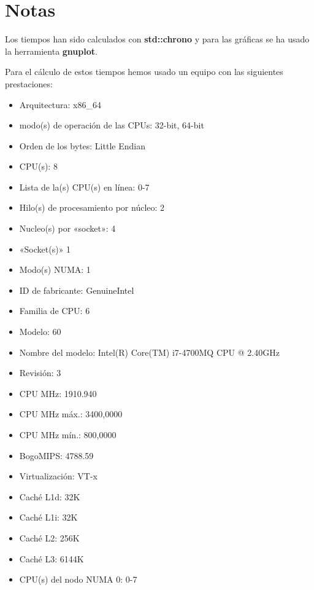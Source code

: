 \documentclass{article}
\begin{document}
\section{Notas}
Los tiempos han sido calculados con {\bf std::chrono} y para las gráficas se ha usado la herramienta {\bf gnuplot}.
\

Para el cálculo de estos tiempos hemos usado un equipo con las siguientes prestaciones:
\begin{itemize}
	\item Arquitectura:                        x86\_64
	\item modo(s) de operación de las CPUs:    32-bit, 64-bit
	\item Orden de los bytes:                  Little Endian
	\item CPU(s):                              8
	\item Lista de la(s) CPU(s) en línea:      0-7
	\item Hilo(s) de procesamiento por núcleo: 2
	\item Nucleo(s) por «socket»:              4
	\item «Socket(s)»                          1
	\item Modo(s) NUMA:                        1
	\item ID de fabricante:                    GenuineIntel
	\item Familia de CPU:                      6
	\item Modelo:                              60
	\item Nombre del modelo:                   Intel(R) Core(TM) i7-4700MQ CPU @ 2.40GHz
	\item Revisión:                            3
	\item CPU MHz:                             1910.940
	\item CPU MHz máx.:                        3400,0000
	\item CPU MHz mín.:                        800,0000
	\item BogoMIPS:                            4788.59
	\item Virtualización:                      VT-x
	\item Caché L1d:                           32K
	\item Caché L1i:                           32K
	\item Caché L2:                            256K
	\item Caché L3:                            6144K
	\item CPU(s) del nodo NUMA 0:              0-7
\end{itemize}
\end{document}
